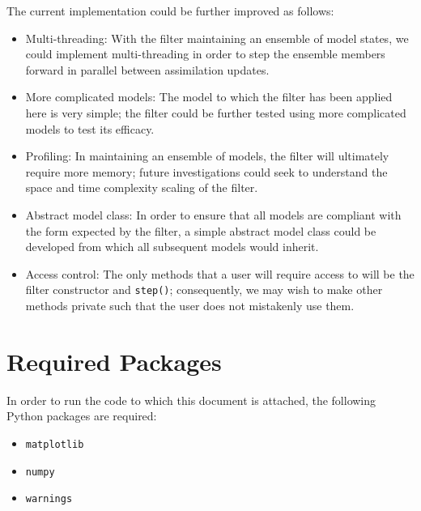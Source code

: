 \documentclass[a4paper, 12pt, twoside]{article}
\begin{document}
The current implementation could be further improved as follows:
\begin{itemize}
    \item Multi-threading: With the filter maintaining an ensemble of model
        states, we could implement multi-threading in order to step the ensemble
        members forward in parallel between assimilation updates.
    \item More complicated models: The model to which the filter has been
        applied here is very simple; the filter could be further tested using
        more complicated models to test its efficacy.
    \item Profiling: In maintaining an ensemble of models, the filter will
        ultimately require more memory; future investigations could seek to
        understand the space and time complexity scaling of the filter.
    \item Abstract model class: In order to ensure that all models are compliant
        with the form expected by the filter, a simple abstract model class
        could be developed from which all subsequent models would inherit.
    \item Access control: The only methods that a user will require access to
        will be the filter constructor and \texttt{step()}; consequently, we may
        wish to make other methods private such that the user does not
        mistakenly use them.
\end{itemize}




\newpage
\appendix
\section{Required Packages}\label{sec:requirements}

In order to run the code to which this document is attached, the following
Python packages are required:
\begin{itemize}
    \item \texttt{matplotlib}
    \item \texttt{numpy}
    \item \texttt{warnings}
\end{itemize}
\end{document}
